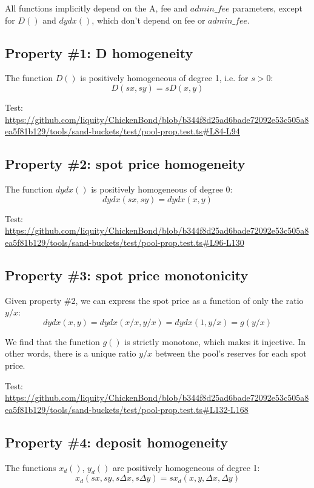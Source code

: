\documentclass{article}
\begin{document}
All functions implicitly depend on the A, fee and $admin\_fee$ parameters, except for $D()$ and $dydx()$, which don't depend on fee or $admin\_fee$.

\subsection{Property \#1: D homogeneity}

The function $D()$ is positively homogeneous of degree 1, i.e. for $s > 0$:
\[
D(sx, sy) = sD(x,y)
\]

Test:
\url{https://github.com/liquity/ChickenBond/blob/b344f8d25ad6bade72092e53c505a8ea5f81b129/tools/sand-buckets/test/pool-prop.test.ts#L84-L94}

\subsection{Property \#2: spot price homogeneity}

The function $dydx()$ is positively homogeneous of degree 0:
\[
dydx(sx, sy) = dydx(x, y)
\]

Test:
\url{https://github.com/liquity/ChickenBond/blob/b344f8d25ad6bade72092e53c505a8ea5f81b129/tools/sand-buckets/test/pool-prop.test.ts#L96-L130}

\subsection{Property \#3: spot price monotonicity}

Given property \#2, we can express the spot price as a function of only the ratio $y/x$:
\[
dydx(x, y) = dydx(x/x, y/x) = dydx(1, y/x) = g(y/x)
\]

We find that the function $g()$ is strictly monotone, which makes it injective. In other words, there is a unique ratio $y/x$ between the pool's reserves for each spot price.

Test:
\url{https://github.com/liquity/ChickenBond/blob/b344f8d25ad6bade72092e53c505a8ea5f81b129/tools/sand-buckets/test/pool-prop.test.ts#L132-L168}

\subsection{Property \#4: deposit homogeneity}

The functions $x_d()$, $y_d()$ are positively homogeneous of degree 1:
\[
x_d(sx, sy, s\Delta{x}, s\Delta{y}) = s x_d(x, y, \Delta{x}, \Delta{y})
\]
\end{document}
